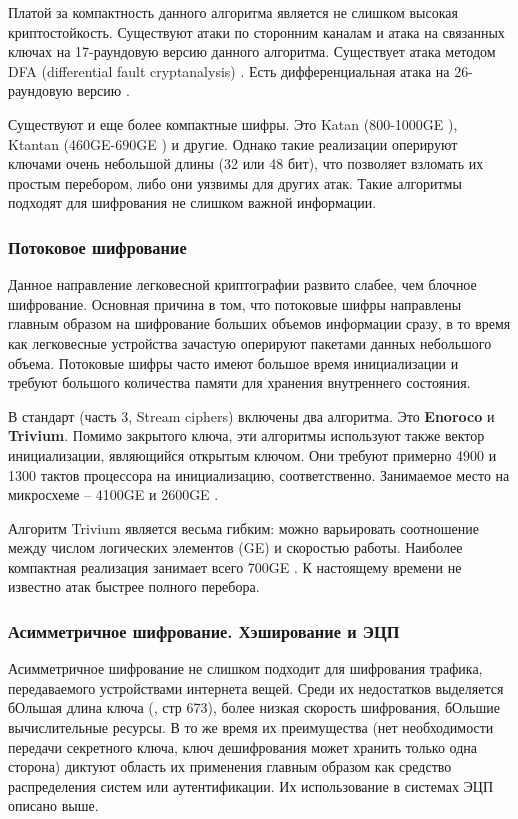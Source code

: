 Платой за компактность данного алгоритма является не слишком высокая криптостойкость. Существуют атаки по сторонним каналам \cite{src40} \cite{src41} и атака на связанных ключах \cite{src42} на 17-раундовую версию данного алгоритма. Существует атака методом DFA (differential fault cryptanalysis) \cite{src43}. Есть дифференциальная атака на 26-раундовую версию \cite{src44}.

Существуют и еще более компактные шифры. Это Katan (800-1000GE \cite{src45}), Ktantan (460GE-690GE \cite{src45}) и другие. Однако такие реализации оперируют ключами очень небольшой длины (32 или 48 бит), что позволяет взломать их простым перебором, либо они уязвимы для других атак. Такие алгоритмы подходят для шифрования не слишком важной информации.

\subsubsection{Потоковое шифрование}

Данное направление легковесной криптографии развито слабее, чем блочное шифрование. Основная причина в том, что потоковые шифры направлены главным образом на шифрование больших объемов информации сразу, в то время как легковесные устройства зачастую оперируют пакетами данных небольшого объема. Потоковые шифры часто имеют большое время инициализации и требуют большого количества памяти для хранения внутреннего состояния.

В стандарт \cite{src26} (часть 3, Stream ciphers) включены два алгоритма. Это \textbf{Enoroco} и \textbf{Trivium}. Помимо закрытого ключа, эти алгоритмы используют также вектор инициализации, являющийся открытым ключом. Они требуют примерно 4900 \cite{src46} и 1300 \cite{src47} тактов процессора на инициализацию, соответственно. Занимаемое место на микросхеме – 4100GE и 2600GE \cite{src48}.

Алгоритм Trivium является весьма гибким: можно варьировать соотношение между числом логических элементов (GE) и скоростью работы. Наиболее компактная реализация занимает всего 700GE \cite{src49}. К настоящему времени не известно атак быстрее полного перебора.

\subsubsection{Асимметричное шифрование. Хэширование и ЭЦП}

Асимметричное шифрование не слишком подходит для шифрования трафика, передаваемого устройствами интернета вещей. Среди их недостатков выделяется бОльшая длина ключа (\cite{src50}, стр 673), более низкая скорость шифрования, бОльшие вычислительные ресурсы. В то же время их преимущества (нет необходимости передачи секретного ключа, ключ дешифрования может хранить только одна сторона) диктуют область их применения главным образом как средство распределения систем или аутентификации. Их использование в системах ЭЦП описано выше.

